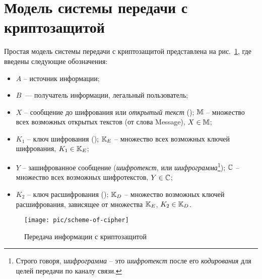 ﻿\section{Модель системы передачи с криптозащитой}

Простая модель системы передачи с криптозащитой представлена на рис.~\ref{pic:Encrypt}, где введены следующие обозначения:
\begin{itemize}
    \item $A$ -- источник информации;
    \item $B$~--- получатель информации, легальный пользователь;
    \item $X$ -- сообщение до шифрования или \emph{открытый текст} (); $\mathbb{M}$ -- множество всех возможных открытых текстов (от слова Message), $X \in \mathbb{M}$;
    \item $K_1$ -- ключ шифрования (); $\mathbb{K}_E$ -- множество всех возможных ключей шифрования, $K_1 \in \mathbb{K}_E$;
    \item $Y$ -- зашифрованное сообщение (\emph{шифротекст},  или \emph{шифрограмма}\footnote{Строго говоря, \emph{шифрограмма} -- это \emph{шифротекст} после его \emph{кодирования} для целей передачи по каналу связи.}); $\mathbb{C}$ -- множество всех возможных шифротекстов, $Y \in \mathbb{C}$;
    \item $K_2$ -- ключ расшифрования (); $\mathbb{K}_D$  -- множество возможных ключей расшифрования, зависящее от множества $\mathbb{K}_E$, $K_2 \in \mathbb{K}_D$.
\end{itemize}

\begin{figure}[!thb]
	\centering
	\texttt{[image: pic/scheme-of-cipher]}
	\caption{Передача информации с криптозащитой\label{pic:Encrypt}}
\end{figure}

